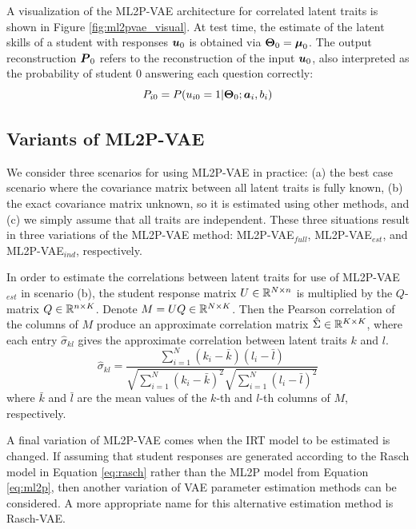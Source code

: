 A visualization of the ML2P-VAE architecture for correlated latent traits is shown in Figure \ref{fig:ml2pvae_visual}. At test time, the estimate of the latent skills of a student with responses $\boldsymbol{u}_0$ is obtained via $\boldsymbol{\Theta}_0 = \boldsymbol{\mu}_0$. The output reconstruction $\boldsymbol{P}_0$ refers  to the reconstruction of the input $\boldsymbol{u}_0$, also interpreted as the probability of student $0$ answering each question correctly:
\[P_{i0} = P(u_{i0} = 1 | \boldsymbol{\Theta}_0; \boldsymbol{a}_i, b_i)\]



\subsection{Variants of ML2P-VAE}\label{sec:variants}

We consider three scenarios for using ML2P-VAE in practice: (a) the best case scenario where the covariance matrix between all latent traits is fully known, (b) the exact covariance matrix unknown, so it is estimated using other methods, and (c) we simply assume that all traits are independent. These three situations result in three variations of the ML2P-VAE method: ML2P-VAE$_{full}$, ML2P-VAE$_{est}$, and ML2P-VAE$_{ind}$, respectively. 

In order to estimate the correlations between latent traits for use of ML2P-VAE$_{est}$ in scenario (b), the student response matrix $U \in \mathbb{R}^{N\times n}$ is multiplied by the $Q$-matrix $Q \in \mathbb{R}^{n \times K}$. Denote $M = UQ \in \mathbb{R}^{N\times K}$. Then the Pearson correlation of the columns of $M$ produce an approximate correlation matrix $\hat \Sigma \in \mathbb{R}^{K \times K}$, where each entry $\hat \sigma_{kl}$ gives the approximate correlation between latent traits $k$ and $l$.
\begin{equation}
  \hat \sigma_{kl} = \frac{\sum_{i=1}^N (k_i - \bar k)(l_i - \bar l)}{\sqrt{\sum_{i=1}^N(k_i - \bar k)^2} \sqrt{\sum_{i=1}^N (l_i - \bar l)^2}}
  \label{eq:approx_cor_mat}
\end{equation}
where $\bar k$ and $\bar l$ are the mean values of the $k$-th and $l$-th columns of $M$, respectively.

A final variation of ML2P-VAE comes when the IRT model to be estimated is changed. If assuming that student responses are generated according to the Rasch model in Equation \ref{eq:rasch} rather than the ML2P model from Equation \ref{eq:ml2p}, then another variation of VAE parameter estimation methods can be considered. A more appropriate name for this alternative estimation method is Rasch-VAE.

